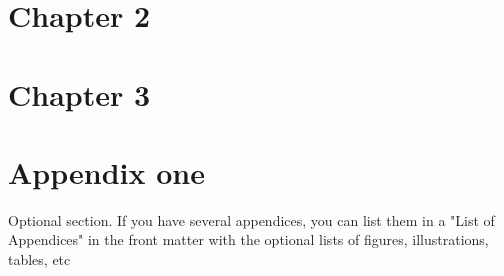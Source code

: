 \documentclass[12pt]{report}
\begin{document}
\chapter{Chapter 2}
\chapter{Chapter 3}
\appendix
\chapter{Appendix one}
\indent\indent Optional section. If you have several appendices, you can list them in a "List of Appendices" in the front matter with the optional lists of figures, illustrations, tables, etc


\singlespacing
\printbibliography[heading=bibintoc, title={Bibliography}]
\end{document}
